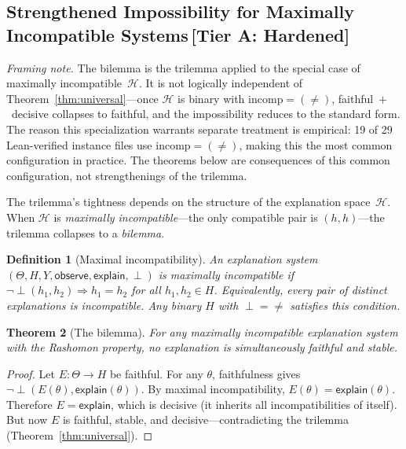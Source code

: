 \documentclass[11pt,a4paper]{article}
\newtheorem{theorem}{Theorem}[section]
\newtheorem{definition}[theorem]{Definition}
\newcommand{\sH}{\mathcal{H}}
\newcommand{\incomp}{\perp}
\begin{document}
\subsection{Strengthened Impossibility for Maximally Incompatible Systems\,\textnormal{\normalsize[Tier A: Hardened]}}
\label{sec:bilemma}

\emph{Framing note.}  The bilemma is the trilemma applied to the special
case of maximally incompatible~$\sH$.  It is not logically independent
of Theorem~\ref{thm:universal}---once $\sH$ is binary with
$\mathrm{incomp} = (\neq)$, faithful~$+$~decisive collapses to faithful,
and the impossibility reduces to the standard form.  The reason this
specialization warrants separate treatment is empirical: 19 of 29
Lean-verified instance files use $\mathrm{incomp} = (\neq)$, making this
the most common configuration in practice.  The theorems below are
consequences of this common configuration, not strengthenings of the
trilemma.

\medskip

The trilemma's tightness depends on the structure of the explanation
space~$\sH$.  When $\sH$ is \emph{maximally incompatible}---the only
compatible pair is $(h, h)$---the trilemma collapses to a \emph{bilemma}.

\begin{definition}[Maximal incompatibility]
\label{def:max-incompat}
An explanation system $(\Theta, H, Y, \mathsf{observe}, \mathsf{explain}, \incomp)$
is \emph{maximally incompatible} if
$\lnot\incomp(h_1, h_2) \Rightarrow h_1 = h_2$
for all $h_1, h_2 \in H$.
Equivalently, every pair of distinct explanations is incompatible.
Any binary $H$ with $\incomp = {\neq}$ satisfies this condition.
\end{definition}

\begin{theorem}[The bilemma]
\label{thm:bilemma}
For any maximally incompatible explanation system with the Rashomon
property, no explanation is simultaneously faithful and stable.
\end{theorem}

\begin{proof}
Let $E : \Theta \to H$ be faithful.  For any $\theta$, faithfulness gives
$\lnot\incomp(E(\theta), \mathsf{explain}(\theta))$.  By maximal
incompatibility, $E(\theta) = \mathsf{explain}(\theta)$.  Therefore
$E = \mathsf{explain}$, which is decisive (it inherits all
incompatibilities of itself).  But now $E$ is faithful, stable, and
decisive---contradicting the trilemma (Theorem~\ref{thm:universal}).
\end{proof}
\end{document}
